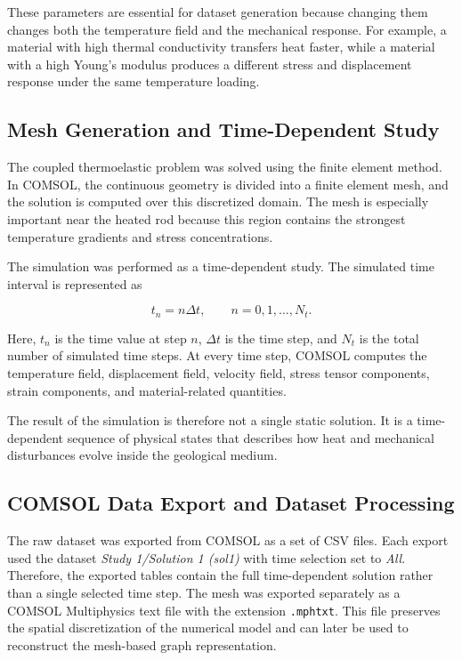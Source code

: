 These parameters are essential for dataset generation because changing them changes both the temperature field and the mechanical response. For example, a material with high thermal conductivity transfers heat faster, while a material with a high Young's modulus produces a different stress and displacement response under the same temperature loading.

\subsection{Mesh Generation and Time-Dependent Study}

The coupled thermoelastic problem was solved using the finite element method. In COMSOL, the continuous geometry is divided into a finite element mesh, and the solution is computed over this discretized domain. The mesh is especially important near the heated rod because this region contains the strongest temperature gradients and stress concentrations.

The simulation was performed as a time-dependent study. The simulated time interval is represented as

\begin{equation}
t_n = n \Delta t,
\qquad
n = 0,1,\ldots,N_t .
\end{equation}

Here, \(t_n\) is the time value at step \(n\), \(\Delta t\) is the time step, and \(N_t\) is the total number of simulated time steps. At every time step, COMSOL computes the temperature field, displacement field, velocity field, stress tensor components, strain components, and material-related quantities.

The result of the simulation is therefore not a single static solution. It is a time-dependent sequence of physical states that describes how heat and mechanical disturbances evolve inside the geological medium.

\subsection{COMSOL Data Export and Dataset Processing}

The raw dataset was exported from COMSOL as a set of CSV files. Each export used the dataset \textit{Study 1/Solution 1 (sol1)} with time selection set to \textit{All}. Therefore, the exported tables contain the full time-dependent solution rather than a single selected time step. The mesh was exported separately as a COMSOL Multiphysics text file with the extension \texttt{.mphtxt}. This file preserves the spatial discretization of the numerical model and can later be used to reconstruct the mesh-based graph representation.

